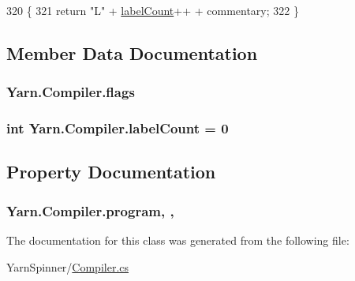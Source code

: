 \begin{DoxyCode}
320                                                        \{
321             \textcolor{keywordflow}{return} \textcolor{stringliteral}{"L"} + \hyperlink{a00029_a87758397eba2e84cda8e0d6c40656f3f}{labelCount}++ + commentary;
322         \}
\end{DoxyCode}


\subsection{Member Data Documentation}
\hypertarget{a00029_a541022d89bcf9bc8f794eb6d6b438d08}{
\subsubsection[{flags}]{ Yarn.\-Compiler.\-flags\hspace{0.3cm}{\ttfamily [private]}}}\label{a00029_a541022d89bcf9bc8f794eb6d6b438d08}
\hypertarget{a00029_a87758397eba2e84cda8e0d6c40656f3f}{
\subsubsection[{label\-Count}]{\setlength{\rightskip}{0pt plus 5cm}int Yarn.\-Compiler.\-label\-Count = 0\hspace{0.3cm}{\ttfamily [private]}}}\label{a00029_a87758397eba2e84cda8e0d6c40656f3f}


\subsection{Property Documentation}
\hypertarget{a00029_aa1737da428ec7d597009661dd8a47829}{
\subsubsection[{program}]{ Yarn.\-Compiler.\-program\hspace{0.3cm}{\ttfamily [get]}, {\ttfamily [set]}, {\ttfamily [package]}}}\label{a00029_aa1737da428ec7d597009661dd8a47829}


The documentation for this class was generated from the following file\-:\begin{DoxyCompactItemize}
\item 
Yarn\-Spinner/\hyperlink{a00116}{Compiler.\-cs}\end{DoxyCompactItemize}
